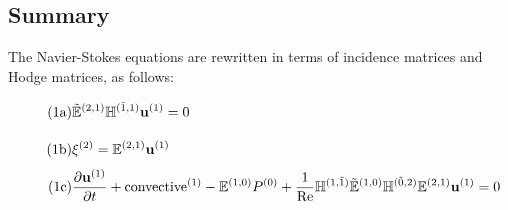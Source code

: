 \subsection{Summary}

The Navier-Stokes equations are rewritten in terms of incidence matrices and Hodge matrices, as follows:
\begin{align}
    \stepcounter{equation}
    \tag{{\theequation}a}
    &\tilde{\mathbb{E}}^{(2,1)} \mathbb{H}^{(\tilde{1},1)} \mathbf{u}^{(1)} = 0 \vphantom{\frac{\partial^{(1)}}{\partial}} \\
    \tag{{\theequation}b}
    &\xi^{(2)} = \mathbb{E}^{(2,1)} \mathbf{u}^{(1)} \vphantom{\frac{\partial^{(1)}}{\partial}} \\
    \tag{{\theequation}c}
    &\frac{\partial \mathbf{u}^{(1)}}{\partial t} + \text{convective}^{(1)} - \mathbb{E}^{(1,0)} P^{(0)} + \frac{1}{\text{Re}} \mathbb{H}^{(1,\tilde{1})} \tilde{\mathbb{E}}^{(1,0)} \mathbb{H}^{(\tilde{0},2)} \mathbb{E}^{(2,1)} \mathbf{u}^{(1)} = 0
\end{align}

